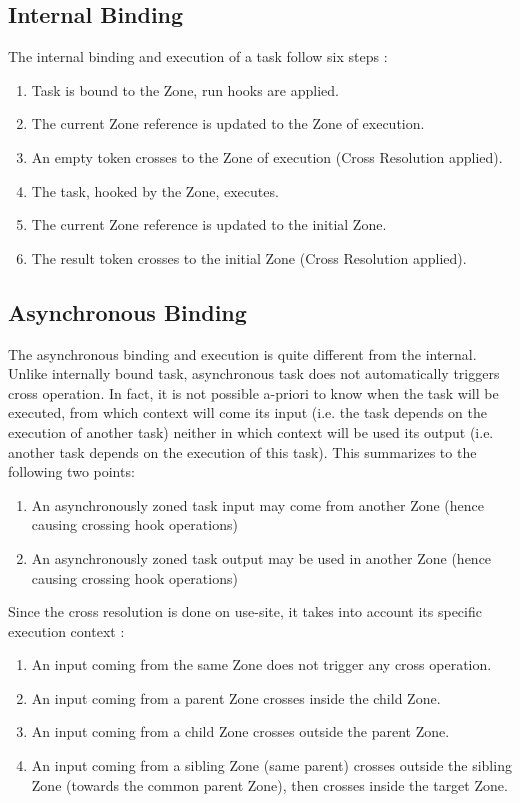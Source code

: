 \subsection*{Internal Binding}

The internal binding and execution of a task follow six steps :
\begin{enumerate}
\item Task is bound to the Zone, run hooks are applied.
\item The current Zone reference is updated to the Zone of execution.
\item An empty token crosses to the Zone of execution (Cross Resolution applied).
\item The task, hooked by the Zone, executes.
\item The current Zone reference is updated to the initial Zone.
\item The result token crosses to the initial Zone (Cross Resolution applied).
\end{enumerate}

\subsection*{Asynchronous Binding}

The asynchronous binding and execution is quite different from the internal. Unlike internally bound task, asynchronous task does not automatically triggers cross operation. In fact, it is not possible a-priori to know when the task will be executed, from which context will come its input (i.e. the task depends on the execution of another task) neither in which context will be used its output (i.e. another task depends on the execution of this task). This summarizes to the following two points:
\begin{enumerate}
\item An asynchronously zoned task input may come from another Zone (hence causing crossing hook operations)
\item An asynchronously zoned task output may be used in another Zone (hence causing crossing hook operations)
\end{enumerate}

Since the cross resolution is done on use-site, it takes into account its specific execution context :
\begin{enumerate}
\item An input coming from the same Zone does not trigger any cross operation.
\item An input coming from a parent Zone crosses inside the child Zone.
\item An input coming from a child Zone crosses outside the parent Zone.
\item An input coming from a sibling Zone (same parent) crosses outside the sibling Zone (towards the common parent Zone), then crosses inside the target Zone.
\end{enumerate}

